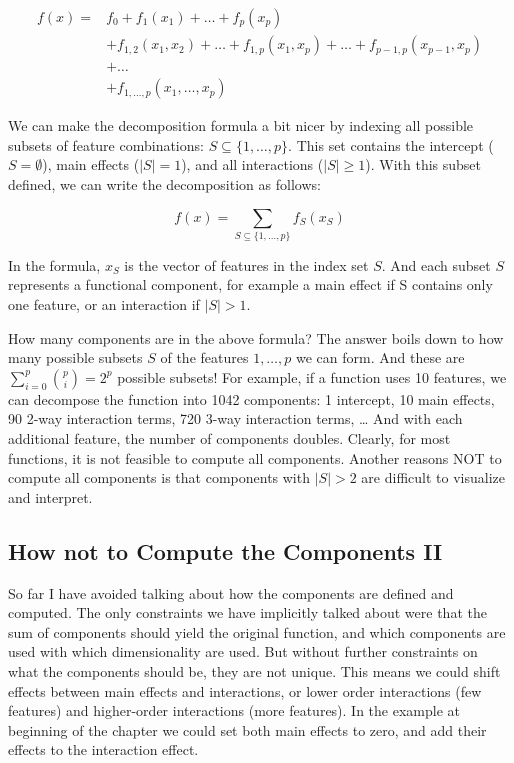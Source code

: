 \documentclass[12pt,]{krantz}
\begin{document}
\begin{align*}f(x) = & f_0 + f_1(x_1) + \ldots + f_p(x_p) \\ & + f_{1,2}(x_1, x_2) + \ldots + f_{1,p}(x_1, x_p) + \ldots + f_{p-1,p}(x_{p-1}, x_p) \\  & + \ldots  \\ & +  f_{1,\ldots,p}(x_1, \ldots, x_p)\end{align*}

We can make the decomposition formula a bit nicer by indexing all
possible subsets of feature combinations: \(S\subseteq\{1,\ldots,p\}\).
This set contains the intercept (\(S=\emptyset\)), main effects
(\(|S|=1\)), and all interactions (\(|S|\geq{}1\)). With this subset
defined, we can write the decomposition as follows:

\[f(x) = \sum_{S\subseteq\{1,\ldots,p\}} f_S(x_S)\]

In the formula, \(x_S\) is the vector of features in the index set
\(S\). And each subset \(S\) represents a functional component, for
example a main effect if S contains only one feature, or an interaction
if \(|S| > 1\).

How many components are in the above formula? The answer boils down to
how many possible subsets \(S\) of the features \(1,\ldots, p\) we can
form. And these are \(\sum_{i=0}^p\binom{p}{i}=2^p\) possible subsets!
For example, if a function uses 10 features, we can decompose the
function into 1042 components: 1 intercept, 10 main effects, 90 2-way
interaction terms, 720 3-way interaction terms, \ldots{} And with each
additional feature, the number of components doubles. Clearly, for most
functions, it is not feasible to compute all components. Another reasons
NOT to compute all components is that components with \(|S|>2\) are
difficult to visualize and interpret.

\subsection{How not to Compute the Components
II}\label{how-not-to-compute-the-components-ii}

So far I have avoided talking about how the components are defined and
computed. The only constraints we have implicitly talked about were that
the sum of components should yield the original function, and which
components are used with which dimensionality are used. But without
further constraints on what the components should be, they are not
unique. This means we could shift effects between main effects and
interactions, or lower order interactions (few features) and
higher-order interactions (more features). In the example at beginning
of the chapter we could set both main effects to zero, and add their
effects to the interaction effect.
\end{document}

